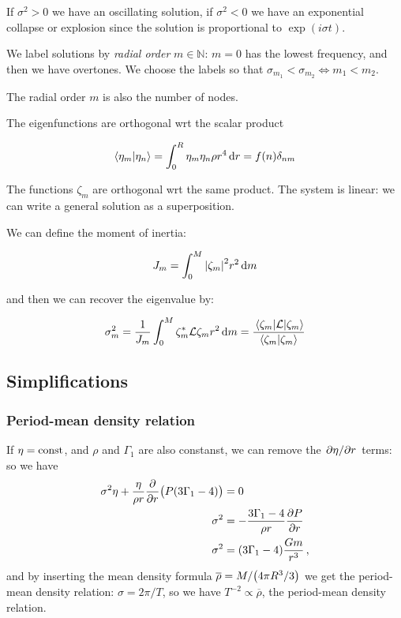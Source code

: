 \documentclass[main.tex]{subfiles}
\begin{document}
If \(\sigma^2 > 0\) we have an oscillating solution, if \(\sigma^2 <0 \) we have an exponential collapse or explosion since the solution is proportional to \(\exp(i \sigma t)\).

We label solutions by \emph{radial order} \(m \in \mathbb{N}\): \(m=0\) has the lowest frequency, and then we have overtones.
We choose the labels so that \(\sigma_{m_1} < \sigma_{m_2} \iff m_1 < m_2\).

The radial order \(m\) is also the number of nodes.

The eigenfunctions are orthogonal wrt the scalar product

\begin{equation}
  \braket{\eta_m}{\eta_n} = \int _{0}   ^{R} \eta_m \eta_n \rho r^4 \dd{r} = f(n) \delta_{nm}
\end{equation}


The functions \(\zeta_m\) are orthogonal wrt the same product. The system is linear: we can write a general solution as a superposition.

We can define the moment of inertia:

\begin{equation}
  J_m = \int _{0}   ^{M} \abs{\zeta_m}^2 r^2 \dd{m}
\end{equation}

and then we can recover the eigenvalue by:

\begin{equation}
  \sigma_m^2 = \frac{1}{J_m} \int_0^M \zeta_m ^* \mathcal L \zeta_m r^2 \dd{m}
  = \frac{\ev{\mathcal{L}}{\zeta_{m}}}{\braket{\zeta_{m}}{\zeta_{m}}}
\end{equation}

\subsection{Simplifications}

\subsubsection{Period-mean density relation}

If \(\eta = \text{const}\), and \(\rho \) and \(\Gamma_1\) are also constanst, we can remove the \(\pdv*{\eta }{r}\) terms: so we have 
%
\begin{align}
\sigma^2 \eta + \frac{\eta }{\rho r} \pdv{}{r} \qty(P \qty(3 \Gamma_1 - 4)) &= 0  \\
\sigma^2 &= - \frac{3 \Gamma_1 - 4}{\rho r} \pdv{P}{r}  \\
\sigma^2 &= \qty( 3\Gamma_1 -4 ) \frac{Gm}{r^3}
\,,
\end{align}
%
and by inserting the mean density formula \(\overline{\rho} = M / \qty(4 \pi R^3 / 3)\) we get the period-mean density relation: \(\sigma = 2 \pi / T\), so we have \(T^{-2} \propto \overline{\rho}\), the period-mean density relation. 
\end{document}
